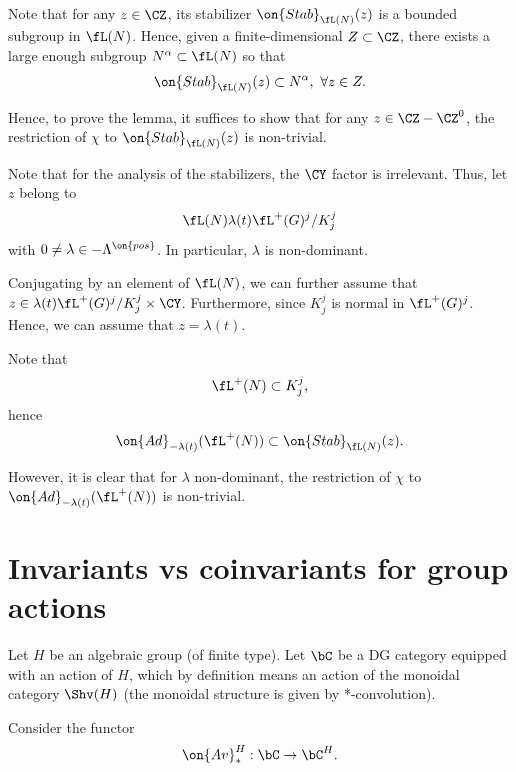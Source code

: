 \documentclass[9pt]{amsart}
\theoremstyle{definition}
\theoremstyle{remark}
\newcommand{\lemref}[1]{Lemma~\ref{#1}}
\numberwithin{equation}{section}
\begin{document}
\ssec{Proof of \lemref{l:character non-trivial}}


Note that for any $z\in \CZ$, its stabilizer $\on{Stab}_{\fL(N)}(z)$ is a bounded subgroup in $\fL(N)$. Hence, given a finite-dimensional
$Z\subset \CZ$, there exists a large enough subgroup $N^\alpha\subset \fL(N)$ so that
$$\on{Stab}_{\fL(N)}(z)\subset N^\alpha,\,\,\forall z\in Z.$$

\medskip

Hence, to prove the lemma, it suffices to show that for any $z\in \CZ-\CZ^0$, 
the restriction of $\chi$ to $\on{Stab}_{\fL(N)}(z)$ is non-trivial. 


Note that for the analysis of the stabilizers, the $\CY$ factor is irrelevant. Thus, let $z$ belong to 
$$\fL(N)\lambda(t)\fL^+(G)^j/K^j_j$$
with $0\neq \lambda\in -\Lambda^{\on{pos}}$. In particular, $\lambda$ is non-dominant. 

\medskip

Conjugating by an element of $\fL(N)$, we can further assume that $z\in  \lambda(t)\fL^+(G)^j/K^j_j\times \CY$. Furthermore, since 
$K^j_j$ is normal in $\fL^+(G)^j$. Hence, we can assume that $z=\lambda(t)$. 


Note that 
$$\fL^+(N)\subset K^j_j,$$
hence
$$\on{Ad}_{-\lambda(t)}(\fL^+(N))\subset \on{Stab}_{\fL(N)}(z).$$

However, it is clear that for $\lambda$ non-dominant, the restriction of $\chi$ to $\on{Ad}_{-\lambda(t)}(\fL^+(N))$
is non-trivial. 

\section{Invariants vs coinvariants for group actions}  \label{s:coinv}


\sssec{}

Let $H$ be an algebraic group (of finite type). Let $\bC$ be a DG category equipped with an action of $H$,
which by definition means an action of the monoidal category $\Shv(H)$ (the monoidal structure is given
by *-convolution). 

\medskip

Consider the functor
\begin{equation} \label{e:Av functor}
\on{Av}^H_*:\bC\to \bC^H.
\end{equation}
\end{document}

